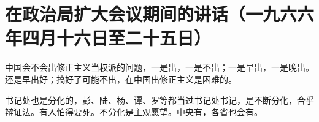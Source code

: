 \section[在政治局扩大会议期间的讲话（一九六六年四月十六日至二十五日）]{在政治局扩大会议期间的讲话（一九六六年四月十六日至二十五日）}


中国会不会出修正主义当权派的问题，一是出，一是不出；一是早出，一是晚出。还是早出好；搞好了可能不出，在中国出修正主义是困难的。

书记处也是分化的，彭、陆、杨、谭、罗等都当过书记处书记，是不断分化，合乎辩证法。有人怕得要死。不分化是主观愿望。中央有，各省也会有。

